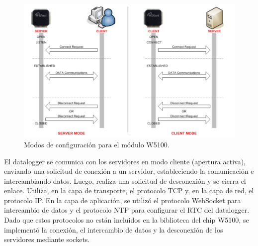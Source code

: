 \begin{figure}[H]
    \centering
    \includegraphics[width=0.9\linewidth]{Figuras/datalogger/Firmware/socketModoDeTrabajoW5100.png}
    \caption{Modos de configuración para el módulo W5100.}
    \label{fig:socketModoDeTrabajoW5100}
\end{figure}

El datalogger se comunica con los servidores en modo cliente (apertura activa), enviando una solicitud de conexión a un servidor, estableciendo la comunicación e intercambiando datos. Luego, realiza una solicitud de desconexión y se cierra el enlace. Utiliza, en la capa de transporte, el protocolo TCP y, en la capa de red, el protocolo IP. En la capa de aplicación, se utilizó el protocolo WebSocket para intercambio de datos y el protocolo NTP para configurar el RTC del datalogger. Dado que estos protocolos no están incluidos en la biblioteca del chip W5100, se implementó la conexión, el intercambio de datos y la desconexión de los servidores mediante sockets.


